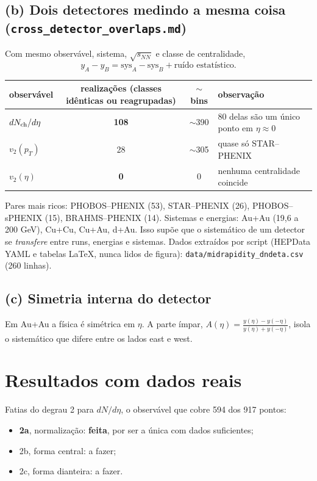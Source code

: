 \documentclass[11pt,a4paper]{article}
\newcommand{\arq}[1]{\texttt{\nolinkurl{#1}}}
\begin{document}
\subsection{\texorpdfstring{(b) Dois detectores medindo a mesma coisa (\arq{cross_detector_overlaps.md})}{(b) Dois detectores medindo a mesma coisa}}
Com mesmo observável, sistema, $\sqrt{s_{NN}}$ e classe de centralidade,
\[
y_A-y_B=\mathrm{sys}_A-\mathrm{sys}_B+\text{ruído estatístico}.
\]
\begin{center}\small
\begin{tabular}{@{}lccl@{}}
\toprule
observável & realizações (classes idênticas ou reagrupadas) & $\sim$bins & observação \\
\midrule
$dN_{\rm ch}/d\eta$ & \textbf{108} & $\sim$390 & 80 delas são um único ponto em $\eta\approx0$ \\
$v_2(p_T)$ & 28 & $\sim$305 & quase só STAR--PHENIX \\
$v_2(\eta)$ & \textbf{0} & 0 & nenhuma centralidade coincide \\
\bottomrule
\end{tabular}
\end{center}
Pares mais ricos: PHOBOS--PHENIX (53), STAR--PHENIX (26), PHOBOS--sPHENIX (15), BRAHMS--PHENIX (14). Sistemas e energias: Au+Au
(19,6 a 200 GeV), Cu+Cu, Cu+Au, d+Au. Isso supõe que o sistemático de um detector se \emph{transfere} entre runs, energias e sistemas.
Dados extraídos por script (HEPData YAML e tabelas \LaTeX{}, nunca lidos de figura): \arq{data/midrapidity_dndeta.csv} (260 linhas).

\subsection{(c) Simetria interna do detector}
Em Au+Au a física é simétrica em $\eta$. A parte ímpar, $A(\eta)=\frac{y(\eta)-y(-\eta)}{y(\eta)+y(-\eta)}$, isola o sistemático que difere
entre os lados east e west.

\section{Resultados com dados reais}
Fatias do degrau 2 para $dN/d\eta$, o observável que cobre 594 dos 917 pontos:
\begin{itemize}[nosep]
\item \textbf{2a}, normalização: \textbf{feita}, por ser a única com dados suficientes;
\item 2b, forma central: a fazer;
\item 2c, forma dianteira: a fazer.
\end{itemize}
\end{document}
